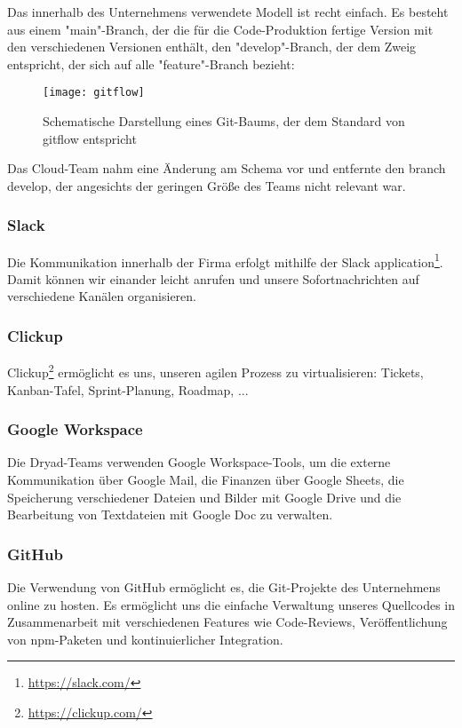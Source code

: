 Das innerhalb des Unternehmens verwendete Modell ist recht einfach. Es besteht aus einem "main"-Branch, der die für die Code-Produktion fertige Version mit den verschiedenen Versionen enthält, den "develop"-Branch, der dem Zweig entspricht, der sich auf alle "feature"-Branch bezieht:

\begin{figure}[h]
  \centering
  \texttt{[image: gitflow]}
  \caption{Schematische Darstellung eines Git-Baums, der dem Standard von gitflow entspricht}
\end{figure}

Das Cloud-Team nahm eine Änderung am Schema vor und entfernte den branch develop, der angesichts der geringen Größe des Teams nicht relevant war.

\subsubsection{Slack}
Die Kommunikation innerhalb der Firma erfolgt mithilfe der Slack application\footnote{\href{https://slack.com/}{https://slack.com/}}.
Damit können wir einander leicht anrufen und unsere Sofortnachrichten auf verschiedene Kanälen organisieren.

\subsubsection{Clickup}

Clickup\footnote{\href{https://clickup.com/}{https://clickup.com/}} ermöglicht es uns, unseren agilen Prozess zu virtualisieren:
Tickets, Kanban-Tafel, Sprint-Planung, Roadmap, ...

\subsubsection{Google Workspace}

Die Dryad-Teams verwenden Google Workspace-Tools, um die externe Kommunikation über Google Mail, die Finanzen über Google Sheets, die Speicherung verschiedener Dateien und Bilder mit Google Drive und die Bearbeitung von Textdateien mit Google Doc zu verwalten.

\subsubsection{GitHub}

Die Verwendung von GitHub ermöglicht es, die Git-Projekte des Unternehmens online zu hosten.
Es ermöglicht uns die einfache Verwaltung unseres Quellcodes in Zusammenarbeit mit verschiedenen Features wie Code-Reviews, Veröffentlichung von npm-Paketen und kontinuierlicher Integration.

